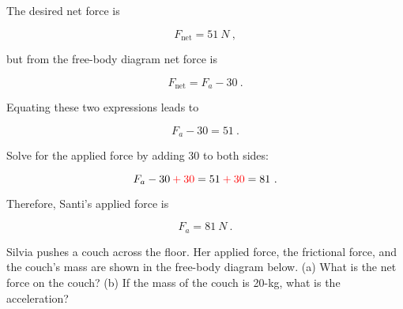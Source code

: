 \documentclass{article}
\begin{document}
The desired net force is

\begin{equation*}
    F_{\text{net}} = \SI{51}{N}\ ,
\end{equation*}

but from the free-body diagram net force is

\begin{equation*}
    F_{\text{net}} = F_a - 30\ .
\end{equation*}

Equating these two expressions leads to

\begin{equation*}
    F_a - 30 = 51\ .
\end{equation*}

Solve for the applied force by adding 30 to both sides:

\begin{equation*}
    F_a - 30 \mathbin{\textcolor{red}{+}} \textcolor{red}{30} 
    = 51 \mathbin{\textcolor{red}{+}} \textcolor{red}{30} = 81\ .
\end{equation*}

Therefore, Santi's applied force is

\begin{equation*}
    F_a = \SI{81}{N}\ .
\end{equation*}

\begin{example} \label{ex:SilviaCouch} 
Silvia pushes a couch across the floor. Her applied force, the frictional force, and the couch's mass are shown in the free-body diagram below. (a) What is the net force on the couch? (b) If the mass of the couch is 20-kg, what is the acceleration? 
\end{example}
\vspace{-1em}

\begin{center}
    
\end{center}
\end{document}
